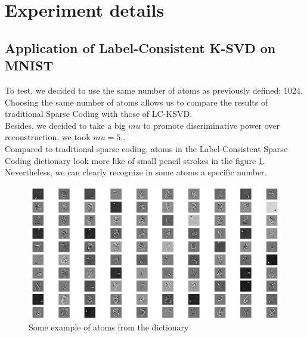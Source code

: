 \section{Experiment details}
\subsection{Application of Label-Consistent K-SVD on MNIST}
To test, we decided to use the same number of atoms as previously defined: 1024.  Choosing the same number of atoms allows us to compare the results of traditional Sparse Coding with those of LC-KSVD.\\ 
Besides, we decided to take a big $mu$ to promote discriminative power over reconstruction, we took $mu = 5$..\\

Compared to traditional sparse coding, atoms in the Label-Consistent Sparse Coding dictionary look more like of small pencil strokes in the figure \ref{fig:DLCKSVD}. Nevertheless, we can clearly recognize in some atoms a specific number.\\
\begin{figure}[h]
 \centering
 \includegraphics[scale=0.5]{DLCKSVD.png}
 \caption{Some example of atoms from the dictionary}
 \label{fig:DLCKSVD}
\end{figure}

